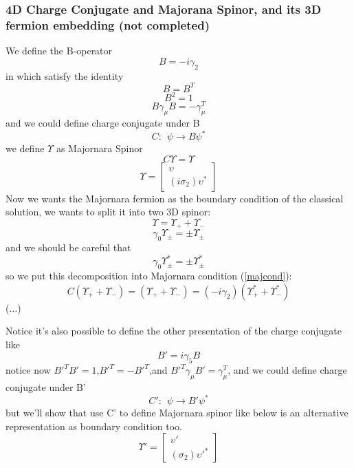 \documentclass[11pt,a4paper]{article}
\begin{document}
\subsubsection{4D Charge Conjugate and Majorana Spinor, and its 3D fermion embedding (not completed)}
We define the B-operator
\begin{equation}
B=-i\gamma_2
\end{equation}
in which satisfy the identity
\begin{equation}
B=B^T
\end{equation}
\begin{equation}
B^2=1
\end{equation}\begin{equation}
B\gamma_{\mu}B=-\gamma^{T}_{\mu}
\end{equation}
and we could define charge conjugate under B
\begin{equation*}
C : \ \ \psi \rightarrow B\psi^*
\end{equation*}
we define $\Upsilon$ as Majornara Spinor
\begin{equation}
C\Upsilon= \Upsilon \label{majcond}
\end{equation}
\begin{equation*}
\Upsilon =\begin{bmatrix}
\upsilon \\
 (i \sigma_2)\upsilon^* 
\end{bmatrix}
\end{equation*}
Now we wants the Majornara fermion as the boundary condition of the classical solution, we wants to split it into two 3D spinor:
\begin{equation}
\Upsilon= \Upsilon_+ +\Upsilon_-
\end{equation}\begin{equation}
\gamma_0 \Upsilon_{\pm} = \pm \Upsilon_{\pm}
\end{equation}
and we should be careful that
\begin{equation}
\gamma_0 \Upsilon^*_{\pm} = \pm \Upsilon^*_{\pm}
\end{equation}
so we put this decomposition into Majornara condition (\ref{majcond}):
\begin{equation}
C(\Upsilon_+ + \Upsilon_-) =(\Upsilon_+ + \Upsilon_-)=(-i\gamma_2)(\Upsilon^*_+ + \Upsilon^*_-)
\end{equation}
($\dots$)

Notice it's also possible to define the other presentation of the charge conjugate like
\begin{equation}
B'=i\gamma_5 B
\end{equation}
notice now $B'^T B'=1$,$B'^T=-B'^T$,and $B'^T\gamma_\mu B'=\gamma^T_\mu$,
and we could define charge conjugate under B'
\begin{equation*}
C' : \ \ \psi \rightarrow B'\psi^*
\end{equation*}but we'll show that use C' to define Majornara spinor like below is an alternative representation as boundary condition too.
\begin{equation*}
\Upsilon' =\begin{bmatrix}
\upsilon' \\
 (\sigma_2)\upsilon'^* 
\end{bmatrix}
\end{equation*}
\end{document}
